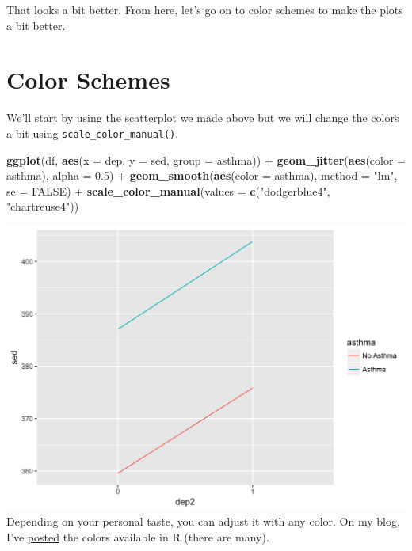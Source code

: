 \documentclass[]{tufte-book}
\newenvironment{Shaded}{}{}
\newcommand{\KeywordTok}[1]{\textcolor[rgb]{0.00,0.44,0.13}{\textbf{#1}}}
\newcommand{\DataTypeTok}[1]{\textcolor[rgb]{0.56,0.13,0.00}{#1}}
\newcommand{\FloatTok}[1]{\textcolor[rgb]{0.25,0.63,0.44}{#1}}
\newcommand{\StringTok}[1]{\textcolor[rgb]{0.25,0.44,0.63}{#1}}
\newcommand{\OtherTok}[1]{\textcolor[rgb]{0.00,0.44,0.13}{#1}}
\newcommand{\OperatorTok}[1]{\textcolor[rgb]{0.40,0.40,0.40}{#1}}
\newcommand{\NormalTok}[1]{#1}
\theoremstyle{definition}
\theoremstyle{definition}
\theoremstyle{remark}
\begin{document}
That looks a bit better. From here, let's go on to color schemes to make
the plots a bit better.

\section*{Color Schemes}\label{color-schemes}

We'll start by using the scatterplot we made above but we will change
the colors a bit using \texttt{scale\_color\_manual()}.

\begin{Shaded}
\begin{Highlighting}[]
\KeywordTok{ggplot}\NormalTok{(df, }\KeywordTok{aes}\NormalTok{(}\DataTypeTok{x =}\NormalTok{ dep, }\DataTypeTok{y =}\NormalTok{ sed, }\DataTypeTok{group =}\NormalTok{ asthma)) }\OperatorTok{+}\StringTok{ }
\StringTok{    }\KeywordTok{geom_jitter}\NormalTok{(}\KeywordTok{aes}\NormalTok{(}\DataTypeTok{color =}\NormalTok{ asthma), }\DataTypeTok{alpha =} \FloatTok{0.5}\NormalTok{) }\OperatorTok{+}\StringTok{ }
\StringTok{    }\KeywordTok{geom_smooth}\NormalTok{(}\KeywordTok{aes}\NormalTok{(}\DataTypeTok{color =}\NormalTok{ asthma), }\DataTypeTok{method =} \StringTok{"lm"}\NormalTok{, }
        \DataTypeTok{se =} \OtherTok{FALSE}\NormalTok{) }\OperatorTok{+}\StringTok{ }\KeywordTok{scale_color_manual}\NormalTok{(}\DataTypeTok{values =} \KeywordTok{c}\NormalTok{(}\StringTok{"dodgerblue4"}\NormalTok{, }
    \StringTok{"chartreuse4"}\NormalTok{))}
\end{Highlighting}
\end{Shaded}

\includegraphics{_main_files/figure-latex/unnamed-chunk-142-1} Depending
on your personal taste, you can adjust it with any color. On my blog,
I've \href{https:/tysonstanley.github.io}{posted} the colors available
in R (there are many).
\end{document}
